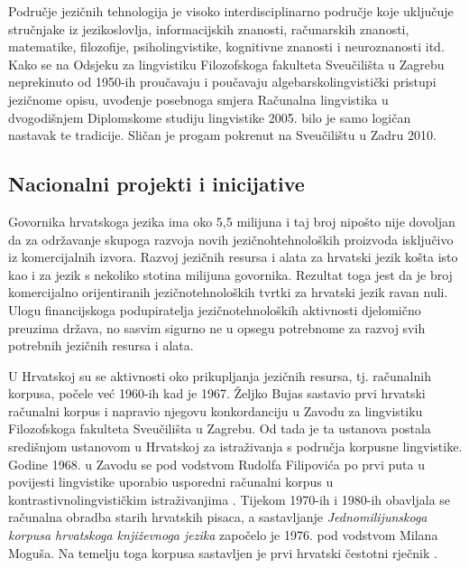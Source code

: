 \begin{multicols}{2}
Područje jezičnih tehnologija je visoko interdisciplinarno područje koje uključuje stručnjake iz jezikoslovlja, informacijskih znanosti, računarskih znanosti, matematike, filozofije, psiholingvistike, kognitivne znanosti i neuroznanosti itd. Kako se na Odsjeku za lingvistiku Filozofskoga fakulteta Sveučilišta u Zagrebu neprekinuto od 1950-ih proučavaju i poučavaju algebarskolingvistički pristupi jezičnome opisu, uvođenje posebnoga smjera Računalna lingvistika u dvogodišnjem Diplomskome studiju lingvistike 2005. bilo je samo logičan nastavak te tradicije. Sličan je progam pokrenut na Sveučilištu u Zadru 2010.

\subsection{Nacionalni projekti i inicijative}

Govornika hrvatskoga jezika ima oko 5,5 milijuna i taj broj nipošto nije dovoljan da za održavanje skupoga razvoja novih jezičnohtehnoloških proizvoda isključivo iz komercijalnih izvora. Razvoj jezičnih resursa i alata za hrvatski jezik košta isto kao i za jezik s nekoliko stotina milijuna govornika. Rezultat toga jest da je broj komercijalno orijentiranih jezičnotehnoloških tvrtki za hrvatski jezik ravan nuli. Ulogu financijskoga podupiratelja jezičnotehnoloških aktivnosti djelomično preuzima država, no sasvim sigurno ne u opsegu potrebnome za razvoj svih potrebnih jezičnih resursa i alata.


U Hrvatskoj su se aktivnosti oko prikupljanja jezičnih resursa, tj. računalnih
korpusa, počele već 1960-ih kad je 1967. Željko Bujas sastavio prvi hrvatski
računalni korpus i napravio njegovu konkordanciju \cite{boo3} u Zavodu za
lingvistiku Filozofskoga fakulteta Sveučilišta u Zagrebu. Od tada je ta
ustanova postala središnjom ustanovom u Hrvatskoj za istraživanja s područja
korpusne lingvistike. Godine 1968. u Zavodu se pod vodstvom Rudolfa Filipovića
po prvi puta u povijesti lingvistike uporabio usporedni računalni korpus u
kontrastivnolingvističkim istraživanjima \cite{art7}. Tijekom 1970-ih i 1980-ih
obavljala se računalna obradba starih hrvatskih pisaca, a sastavljanje
\emph{Jednomilijunskoga korpusa hrvatskoga književnoga jezika} započelo je
1976. pod vodstvom Milana Moguša. Na temelju toga korpusa sastavljen je prvi
hrvatski čestotni rječnik \cite{boo4}.


\end{multicols}
